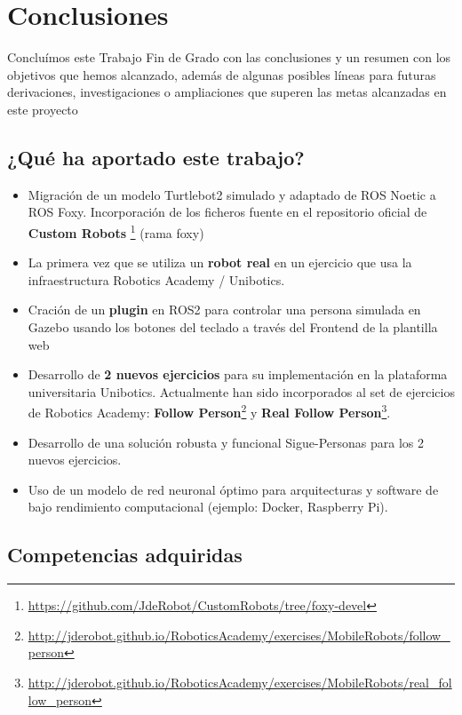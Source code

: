 \chapter{Conclusiones}
\label{cap:Conclusiones}

Concluímos este Trabajo Fin de Grado con las conclusiones y un resumen con los objetivos que hemos alcanzado, además de algunas posibles líneas para futuras derivaciones, investigaciones o ampliaciones que superen las metas alcanzadas en este proyecto

\section{¿Qué ha aportado este trabajo?}
\label{sec:aportaciones}

\begin{itemize}
	\item Migración de un modelo Turtlebot2 simulado y adaptado de ROS Noetic a ROS Foxy. Incorporación de los ficheros fuente en el repositorio oficial de \textbf{Custom Robots} \footnote{\url{https://github.com/JdeRobot/CustomRobots/tree/foxy-devel}} (rama foxy)
	\item La primera vez que se utiliza un \textbf{robot real} en un ejercicio que usa la infraestructura Robotics Academy / Unibotics.
	\item Cración de un \textbf{plugin} en ROS2 para controlar una persona simulada en Gazebo usando los botones del teclado a través del Frontend de la plantilla web
	\item Desarrollo de \textbf{2 nuevos ejercicios} para su implementación en la plataforma universitaria Unibotics. Actualmente han sido incorporados al set de ejercicios de Robotics Academy: \textbf{Follow Person}\footnote{\url{http://jderobot.github.io/RoboticsAcademy/exercises/MobileRobots/follow_person}} y \textbf{Real Follow Person}\footnote{\url{http://jderobot.github.io/RoboticsAcademy/exercises/MobileRobots/real_follow_person}}.
	\item Desarrollo de una solución robusta y funcional Sigue-Personas para los 2 nuevos ejercicios.
	\item Uso de un modelo de red neuronal óptimo para arquitecturas y software de bajo rendimiento computacional (ejemplo: Docker, Raspberry Pi).
\end{itemize}

\section{Competencias adquiridas}
\label{sec:competencias}

